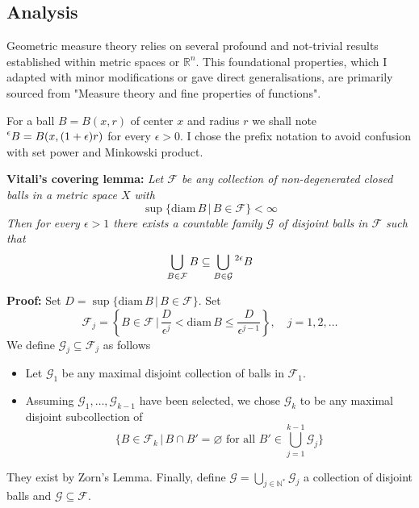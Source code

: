 \subsection{Analysis}
Geometric measure theory relies on several profound and not-trivial results
established within metric spaces or $\mathbb{R}^n$. This foundational
properties, which I adapted with minor modifications or gave direct
generalisations, are primarily sourced from "Measure theory and fine properties
of functions".

\vspace{2ex}
For a ball $B=B(x, r)$ of center $x$ and radius $r$ we shall note $\prescript{\epsilon}{}B
=B(x, (1+\epsilon)r)$ for every $\epsilon>0$. I chose the prefix notation to
avoid confusion with set power and Minkowski product.

\vspace{1ex}
\textbf{Vitali's covering lemma:} \textit{
Let $\mathcal{F}$ be any collection of non-degenerated closed balls in a metric
space $X$ with
\[ \sup\{\text{diam}\,B\,|\, B\in\mathcal{F}\}<\infty \]
Then for every $\epsilon>1$ there exists a countable family $\mathcal{G}$ of
disjoint balls in $\mathcal{F}$ such that
\[\bigcup_{B\in\mathcal{F}}B\subseteq\bigcup_{B\in\mathcal{G}}\prescript{2\epsilon}{}B\]}

\vspace{1ex}
\textbf{Proof:}
Set $D=\sup\{\text{diam}\,B\,|\,B\in \mathcal{F}\}$. Set
\[\mathcal{F}_j=\left\{B\in\mathcal{F}\,|\,\frac{D}{\epsilon^j}<\text{diam}\,B\leq\frac{D}{\epsilon^{j-1}}\right\},\quad j=1,2,\ldots\]
We define $\mathcal{G}_j\subseteq\mathcal{F}_j$ as follows
\begin{itemize}
    \item Let $\mathcal{G}_1$ be any maximal disjoint collection of balls in
        $\mathcal{F}_1$.

    \item Assuming $\mathcal{G}_1,\ldots,\mathcal{G}_{k-1}$ have been selected,
        we chose $\mathcal{G}_k$ to be any maximal disjoint subcollection of
        \[ \{B\in\mathcal{F}_k\,|\,B\cap B'=\varnothing\text{ for all }B'\in\bigcup_{j=1}^{k-1}\mathcal{G}_j\}\]
\end{itemize}
They exist by Zorn's Lemma. Finally, define $\mathcal{G}=\bigcup_{j\in\mathbb{N}^*}\mathcal{G}_j$
a collection of disjoint balls and $\mathcal{G}\subseteq\mathcal{F}$.

